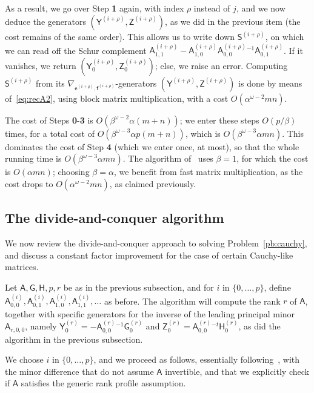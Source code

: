 \documentclass{sig-alternate}
\newcommand{\ve}{\ensuremath{\mathsf{e}}}
\newcommand{\vf}{\ensuremath{\mathsf{f}}}
\newcommand{\mA}{\ensuremath{\mathsf{A}}}
\newcommand{\mG}{\ensuremath{\mathsf{G}}}
\newcommand{\mH}{\ensuremath{\mathsf{H}}}
\newcommand{\mS}{\ensuremath{\mathsf{S}}}
\newcommand{\mY}{\ensuremath{\mathsf{Y}}}
\newcommand{\mZ}{\ensuremath{\mathsf{Z}}}
\begin{document}
As a result, we go over Step {\bf 1} again, with index $\rho$ instead
of $j$, and we now deduce the generators
$(\mY^{(i+\rho)},\mZ^{(i+\rho)})$, as we did in the previous item (the
cost remains of the same order).  This allows us to write down 
$\mS^{(i+\rho)}$, on which we can read off the Schur complement
$\mA^{(i+\rho)}_{1,1} - \mA^{(i+\rho)}_{1,0} \mA^{(i+\rho)}_{0,0}{}^{-1}
\mA^{(i+\rho)}_{0,1}$.  If it vanishes, we return
$(\mY^{(i+\rho)}_0,\mZ^{(i+\rho)}_{0})$; else, we raise an error. Computing
$\mS^{(i+\rho)}$ from its
$\nabla_{\ve^{(i+\rho)},\vf^{(i+\rho)}}$-generators
$(\mY^{(i+\rho)},\mZ^{(i+\rho)})$ is done by means of~\eqref{eq:recA2},
using block matrix multiplication, with a cost 
$O(\alpha^{\omega-2} mn)$.

\medskip

The cost of Steps {\bf 0}-{\bf 3} is $O(\beta^{\omega-2} \alpha
(m+n))$; we enter these steps $O(p/\beta)$ times, for a total cost of
$O(\beta^{\omega-3} \alpha p(m+n))$, which is $O(\beta^{\omega-3}
\alpha mn)$. This dominates the cost of Step {\bf 4} (which we enter
once, at most), so that the whole running time is $O(\beta^{\omega-3}
\alpha mn)$. The algorithm of~\cite{Mouilleron08} uses $\beta=1$, for
which the cost is $O(\alpha mn)$; choosing $\beta=\alpha$, we benefit
from fast matrix multiplication, as the cost drops to
$O(\alpha^{\omega-2} mn)$, as claimed previously.


\subsection{The divide-and-conquer algorithm}\label{ssec:MBA-C}

We now review the divide-and-conquer approach to solving
Problem~\ref{pb:cauchy}, and discuss a constant factor improvement for
the case of certain Cauchy-like matrices. 

Let $\mA,\mG,\mH,p,r$ be as in the previous subsection, and for $i$ in
$\{0,\dots,p\}$, define
${\mA^{(i)}_{0,0}},\mA^{(i)}_{0,1},\mA^{(i)}_{1,0},\mA^{(i)}_{1,1},\dots$ as before.
The algorithm will compute the rank $r$ of $\mA$, together with
specific generators for the inverse of the leading principal minor
$\mA_{r,0,0}$, namely $\mY^{(r)}_0=-\mA^{(r)}_{0,0}{}^{-1} \mG^{(r)}_0$ and
  $\mZ^{(r)}_0=\mA^{(r)}_{0,0}{}^{-t}\mH^{(r)}_0$, as did the algorithm in the
  previous subsection.

We choose $i$ in $\{0,\dots,p\}$, and we proceed as follows,
essentially following~\cite{JeMo10}, with the minor difference that do
not assume $\mA$ invertible, and that we explicitly check if $\mA$
satisfies the generic rank profile assumption.
\end{document}
